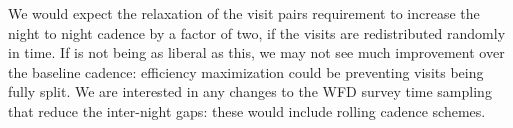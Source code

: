 We would expect the relaxation of the visit pairs requirement to
increase the  night to night cadence by a factor of two, if the visits
are redistributed randomly in time. If \OpSim is not being as liberal as
this, we may not see much improvement over the baseline cadence:
efficiency maximization could be preventing visits being fully split. We
are interested in any changes to the WFD survey time sampling that
reduce the inter-night gaps: these  would include rolling cadence
schemes.


%
%
%
%
%
%
%
%
%
%
%
